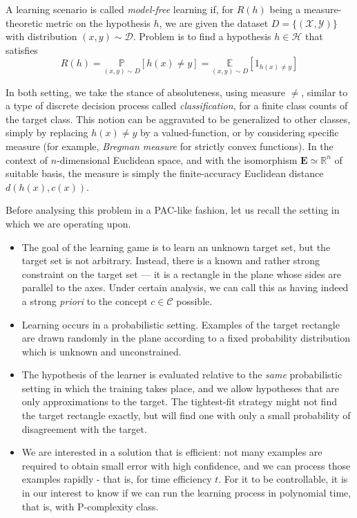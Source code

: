 \begin{definition}
    A learning scenario is called \textit{model-free} learning if, for $R(h)$ being a measure-theoretic metric on the hypothesis $h$, we are given the dataset $D=\{ (\mathcal{X},\mathcal{Y}) \}$ with distribution $(x,y)\sim \mathcal{D}$. Problem is to find a hypothesis $h\in\mathcal{H}$ that satisfies \begin{equation}
        R(h) = \underset{(x,y)\sim D}{\mathbb{P}} [h(x)\neq y] = \underset{(x,y)\sim D}{\mathbb{E}} [1_{h(x)\neq y}]
    \end{equation}
\end{definition}
In both setting, we take the stance of absoluteness, using measure $\neq$, similar to a type of discrete decision process called \textit{classification}, for a finite class counts of the target class. This notion can be aggravated to be generalized to other classes, simply by replacing $h(x)\neq y$ by a valued-function, or by considering specific measure (for example, \textit{Bregman measure} for strictly convex functions). In the context of $n$-dimensional Euclidean space, and with the isomorphism $\mathbf{E}\simeq \mathbb{R}^{n}$ of suitable basis, the measure is simply the finite-accuracy Euclidean distance $d(h(x),c(x))$. 

Before analysing this problem in a PAC-like fashion, let us recall the setting in which we are operating upon. 
\begin{itemize}[topsep=0pt]
    \item The goal of the learning game is to learn an unknown target set, but the target set is not arbitrary. Instead, there is a known and rather strong constraint on the target set --- it is a rectangle in the plane whose sides are parallel to the axes. Under certain analysis, we can call this as having indeed a strong \textit{priori} to the concept $c\in \mathcal{C}$ possible. 
  
    \item Learning occurs in a probabilistic setting. Examples of the target rectangle are drawn randomly in the plane according to a fixed probability distribution which is unknown and unconstrained.
  
    \item The hypothesis of the learner is evaluated relative to the \textit{same} probabilistic setting in which the training takes place, and we allow hypotheses that are only approximations to the target. The tightest-fit strategy might not find the target rectangle exactly, but will find one with only a small probability of disagreement with the target. 
  
    \item We are interested in a solution that is efficient: not many examples are required to obtain small error with high confidence, and we can process those examples rapidly - that is, for time efficiency $t$. For it to be controllable, it is in our interest to know if we can run the learning process in polynomial time, that is, with $\mathrm{P}$-complexity class. 
  \end{itemize}

